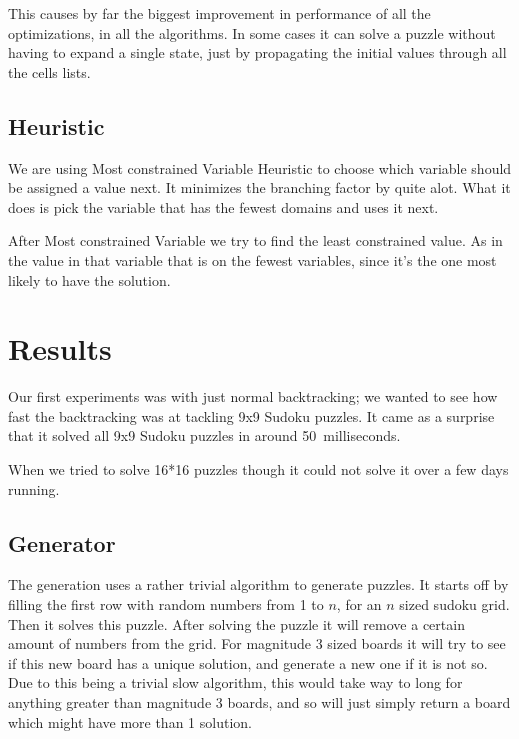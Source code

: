 \documentclass[12pt,a4paper]{article}
\begin{document}
This causes by far the biggest improvement in performance of all the optimizations,
in all the algorithms. In some cases it can solve a puzzle without having to
expand a single state, just by propagating the initial values through all the
cells lists.

\subsection*{Heuristic}

We are using Most constrained Variable Heuristic to choose which variable should
be assigned a value next. It minimizes the branching factor by quite alot.
What it does is pick the variable that has the fewest domains and uses it next.

After Most constrained Variable we try to find the least constrained value. As in 
the value in that variable that is on the fewest variables, since it's the one most
likely to have the solution.

\section*{Results}%

Our first experiments was with just normal backtracking; we wanted to see how fast
the backtracking was at tackling 9x9 Sudoku puzzles. It came as a surprise that
it solved all 9x9 Sudoku puzzles in around 50~milliseconds.

When we tried to solve 16*16 puzzles though it could not solve it over a few days
running.

\subsection*{Generator}

The generation uses a rather trivial algorithm to generate puzzles. It starts
off by filling the first row with random numbers from 1 to $n$, for an $n$ sized
sudoku grid. Then it solves this puzzle. After solving the puzzle it will remove
a certain amount of numbers from the grid. For magnitude 3 sized boards it will
try to see if this new board has a unique solution, and generate a new one if
it is not so. Due to this being a trivial slow algorithm, this would take way
to long for anything greater than magnitude 3 boards, and so will just simply
return a board which might have more than 1 solution.
\end{document}
